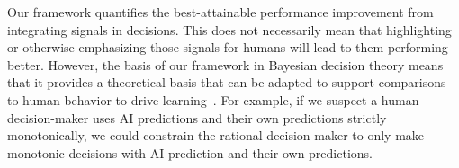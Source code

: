 Our framework quantifies the best-attainable performance improvement from integrating signals in decisions. This does not necessarily mean that highlighting or otherwise emphasizing those signals for humans will lead to them performing better. However, the basis of our framework in Bayesian decision theory means that it provides a theoretical basis that can be adapted to support comparisons to human behavior to drive learning~\citep{hullman2021designing}. 
For example, if we suspect a human decision-maker uses AI predictions and their own predictions strictly monotonically, we could constrain the rational decision-maker to only make monotonic decisions with AI prediction and their own predictions.


